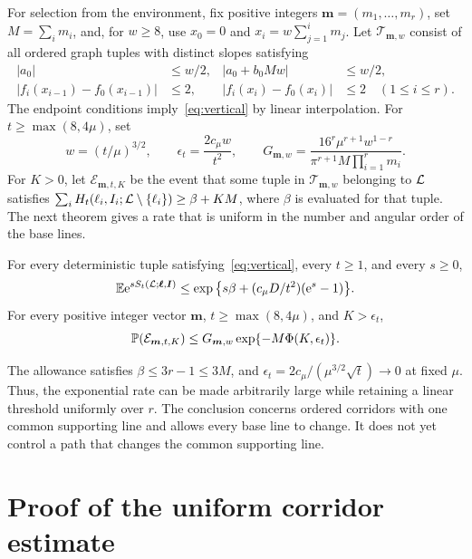 \documentclass[11pt,letterpaper]{article}
\begin{document}
For selection from the environment, fix positive integers $\boldsymbol m=(m_1,\ldots,m_r)$, set $M=\sum_i m_i$, and, for $w\ge8$, use $x_0=0$ and $x_i=w\sum_{j=1}^i m_j$. Let $\mathcal T_{\boldsymbol m,w}$ consist of all ordered graph tuples with distinct slopes satisfying
\begin{equation}\label{eq:tuple}
\begin{aligned}
 |a_0|&\le w/2, & |a_0+b_0Mw|&\le w/2,\\
 |f_i(x_{i-1})-f_0(x_{i-1})|&\le2,
 &|f_i(x_i)-f_0(x_i)|&\le2\quad(1\le i\le r).
\end{aligned}
\end{equation}
The endpoint conditions imply~\eqref{eq:vertical} by linear interpolation. For $t\ge\max(8,4\mu)$, set
\[
 w=(t/\mu)^{3/2},\qquad \epsilon_t=\frac{2c_\mu w}{t^2},\qquad
 G_{\boldsymbol m,w}=\frac{16^r\mu^{r+1}w^{1-r}}
          {\pi^{r+1}M\prod_{i=1}^r m_i}.
\]
For $K>0$, let $\mathcal E_{\boldsymbol m,t,K}$ be the event that some tuple in $\mathcal T_{\boldsymbol m,w}$ belonging to $\cL$ satisfies $\sum_iH_t(\ell_i,I_i;\cL\setminus\{\ell_i\})\ge\beta+KM$, where $\beta$ is evaluated for that tuple. The next theorem gives a rate that is uniform in the number and angular order of the base lines.

\begin{theorem}\label{thm:uniform}
For every deterministic tuple satisfying~\eqref{eq:vertical}, every $t\ge1$, and every $s\ge0$,
\begin{equation}\label{eq:moment}
 \E\e^{sS_t(\cL;\boldsymbol\ell,\boldsymbol I)}
 \le\exp\big\{s\beta+(c_\mu D/t^2)(\e^s-1)\big\}.
\end{equation}
For every positive integer vector $\boldsymbol m$, $t\ge\max(8,4\mu)$, and $K>\epsilon_t$,
\begin{equation}\label{eq:selected}
 \P(\mathcal E_{\boldsymbol m,t,K})
 \le G_{\boldsymbol m,w}\exp\{-M\Phi(K,\epsilon_t)\}.
\end{equation}
\end{theorem}

The allowance satisfies $\beta\le3r-1\le3M$, and $\epsilon_t=2c_\mu/(\mu^{3/2}\sqrt t)\to0$ at fixed $\mu$. Thus, the exponential rate can be made arbitrarily large while retaining a linear threshold uniformly over $r$. The conclusion concerns ordered corridors with one common supporting line and allows every base line to change. It does not yet control a path that changes the common supporting line.

\section{Proof of the uniform corridor estimate}
\end{document}
